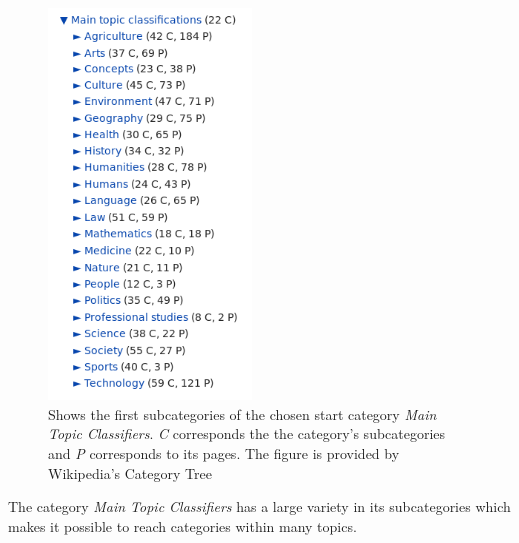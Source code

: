 \begin{figure}
\begin{center}
\includegraphics[width=0.48\textwidth]{Chapters/Implementation/Maintopicclassifiers.png}
\end{center}
\caption[Subcategories of \emph{Main Topic Classifiers}]{Shows the first subcategories of the chosen start category \emph{Main Topic Classifiers}. \emph{C} corresponds the the category's subcategories and \emph{P} corresponds to its pages. The figure is provided by Wikipedia's Category Tree }
\vspace{-20pt}
\label{fig:mainclassifiers}
\end{figure}

The category \emph{Main Topic Classifiers} has a large variety in its subcategories which makes it possible to reach categories within many topics. 

